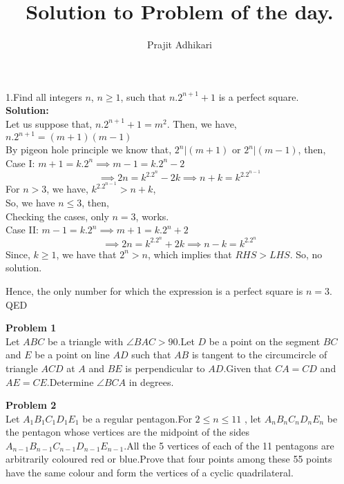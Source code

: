 \documentclass{article}
\begin{document}
\title{Solution to Problem of the day.}
\author{Prajit Adhikari}
\maketitle



1.Find all integers $n$, $n \geq 1$, such that $n . 2^{n+1} + 1$ is a perfect square.\\
\textbf{Solution:}\\
Let us suppose that, $n. 2^{n+1}+1= m^2$. Then, we have,
$n.2^{n+1} = (m+1)(m-1)$\\
By pigeon hole principle we know that, $2^{n}| (m+1)$  or $2^{n}| (m-1)$, then,\\ 
Case I: $m+1= k. 2^n \implies m-1= k.2^n-2$\\
$$\implies 2n= k^2.2^n-2k \implies n+k= k^2.2^{n-1}$$
For $n>3$, we have, $k^2.2^{n-1}> n+k$,\\
So, we have $n \leq 3$, then,\\
Checking the cases, only $n=3$, works.\\

Case II: $m-1= k.2^n \implies m+1= k.2^n+2$\\
$$\implies 2n= k^2.2^n+2k \implies n-k =k^2.2^n$$
Since, $k \geq 1$, we have that $2^n>n$, which implies that $RHS>LHS$. So, no solution.

Hence, the only number for which the expression is a perfect square is $n=3$. QED



\textbf{Problem 1}\\
Let $ABC$ be a triangle with $\angle{BAC} > 90$.Let $D$ be a point on the segment $BC$ and $E$ be a point on line $AD$ such that $AB$ is tangent to the circumcircle of triangle $ACD$ at $A$ and $BE$ is perpendicular to $AD$.Given that $CA=CD$ and $AE=CE$.Determine $\angle{BCA}$ in degrees.\newline

\textbf{Problem 2}\\
Let $A_1B_1C_1D_1E_1$ be a regular pentagon.For $ 2 \le n \le 11$ , let $A_nB_nC_nD_nE_n$ be the pentagon whose vertices are the midpoint of the sides $A_{n-1}B_{n-1}C_{n-1}D_{n-1}E_{n-1}$.All the 5 vertices of each of the 11 pentagons are arbitrarily coloured red or blue.Prove that four points among these 55 points have the same colour and form the vertices of a cyclic quadrilateral.\newline
\end{document}

